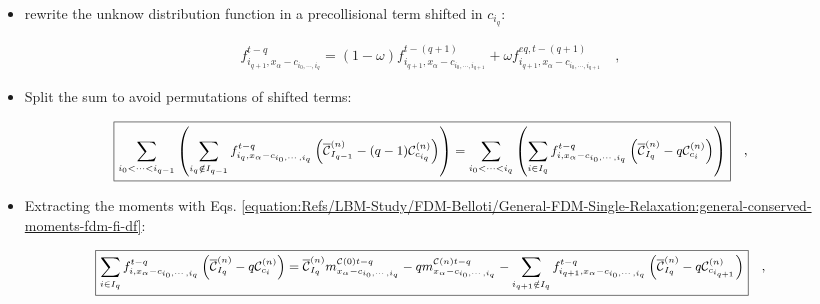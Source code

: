 \documentclass[letterpaper,10pt,english,openany,oneside]{jupyterBook}
\begin{document}
\begin{itemize}
\item {} 
\sphinxAtStartPar
rewrite the unknow distribution function in a pre\sphinxhyphen{}collisional term shifted in \(c_{i_{q}}\):

\end{itemize}
\begin{equation*}
\begin{split}
\boxed{  f_{i_{q+1},x_{\alpha}-c_{i_{0},\cdots,i_{q}}}^{t-q} =  (1-\omega)f_{i_{q+1},x_{\alpha}-c_{i_{0},\cdots,i_{q+1}}}^{t-(q+1)}  + \omega f_{i_{q+1},x_{\alpha}-c_{i_{0},\cdots,i_{q+1}}}^{eq,t-(q+1)} }\quad,
\end{split}
\end{equation*}\begin{itemize}
\item {} 
\sphinxAtStartPar
Split the sum to avoid permutations of shifted terms:

\end{itemize}
\begin{equation*}
\begin{split}\small
\boxed{ \displaystyle\sum_{i_{0}<\cdots <i_{q-1}} \left( \displaystyle\sum_{i_{q}\notin I_{q-1}}  f_{i_{q},x_{\alpha}-c_{i_{0},\cdots,i_{q}}}^{t-q} \left( \overline{\mathcal{C}}_{I_{q-1}}^{(n)} - (q-1) \mathcal{C}_{c_{i_{q}}}^{(n)} \right) \right) = \displaystyle\sum_{i_{0}<\cdots <i_{q}} \left( \displaystyle\sum_{i \in I_{q}} f_{i,x_{\alpha}-c_{i_{0},\cdots,i_{q}}}^{t-q} \left( \overline{\mathcal{C}}_{I_{q}}^{(n)} - q \mathcal{C}_{c_{i}}^{(n)} \right) \right) }\quad,
\end{split}
\end{equation*}\begin{itemize}
\item {} 
\sphinxAtStartPar
Extracting the moments with Eqs. \eqref{equation:Refs/LBM-Study/FDM-Belloti/General-FDM-Single-Relaxation:general-conserved-moments-fdm-fi-df}:

\end{itemize}
\begin{equation*}
\begin{split}\small
\boxed{  \sum_{i \in I_{q}} f_{i,x_{\alpha}-c_{i_{0},\cdots,i_{q}}}^{t-q} \left( \overline{\mathcal{C}}_{I_{q}}^{(n)} - q \mathcal{C}_{c_{i}}^{(n)} \right)  = \overline{\mathcal{C}}_{I_{q}}^{(n)} m_{x_{\alpha}-c_{i_{0},\cdots,i_{q}}}^{\mathcal{C}(0)t-q} - q m_{x_{\alpha}-c_{i_{0},\cdots,i_{q}}}^{\mathcal{C}(n)t-q} - \sum_{i_{q+1} \notin I_{q}} f_{i_{q+1},x_{\alpha}-c_{i_{0},\cdots,i_{q}}}^{t-q} \left( \overline{\mathcal{C}}_{I_{q}}^{(n)} - q \mathcal{C}_{c_{i_{q+1}}}^{(n)} \right) }\quad,
\end{split}
\end{equation*}
\end{document}
